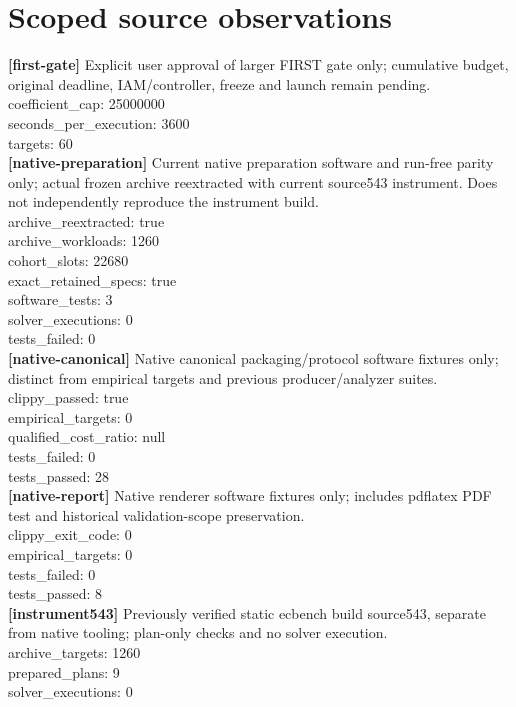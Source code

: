\documentclass[11pt]{article}
\begin{document}
\section*{Scoped source observations}
\textbf{[first-gate]} Explicit user approval of larger FIRST gate only; cumulative budget, original deadline, IAM/controller, freeze and launch remain pending.\\
coefficient\_cap: 25000000\\
seconds\_per\_execution: 3600\\
targets: 60\\
\textbf{[native-preparation]} Current native preparation software and run-free parity only; actual frozen archive reextracted with current source543 instrument. Does not independently reproduce the instrument build.\\
archive\_reextracted: true\\
archive\_workloads: 1260\\
cohort\_slots: 22680\\
exact\_retained\_specs: true\\
software\_tests: 3\\
solver\_executions: 0\\
tests\_failed: 0\\
\textbf{[native-canonical]} Native canonical packaging/protocol software fixtures only; distinct from empirical targets and previous producer/analyzer suites.\\
clippy\_passed: true\\
empirical\_targets: 0\\
qualified\_cost\_ratio: null\\
tests\_failed: 0\\
tests\_passed: 28\\
\textbf{[native-report]} Native renderer software fixtures only; includes pdflatex PDF test and historical validation-scope preservation.\\
clippy\_exit\_code: 0\\
empirical\_targets: 0\\
tests\_failed: 0\\
tests\_passed: 8\\
\textbf{[instrument543]} Previously verified static ecbench build source543, separate from native tooling; plan-only checks and no solver execution.\\
archive\_targets: 1260\\
prepared\_plans: 9\\
solver\_executions: 0\\
\end{document}
